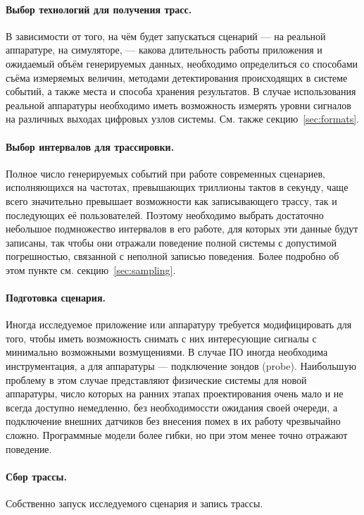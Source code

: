 \paragraph{Выбор технологий для получения трасс.} В зависимости от того, на чём будет запускаться сценарий --- на реальной аппаратуре, на симуляторе, --- какова длительность работы  приложения и ожидаемый объём генерируемых данных, необходимо определиться со способами съёма измеряемых величин, методами детектирования происходящих в системе событий, а также места и способа хранения результатов. В случае использования реальной аппаратуры необходимо иметь возможность измерять уровни сигналов на различных выходах цифровых узлов системы. См. также секцию~\ref{sec:formats}.

\paragraph{Выбор интервалов для трассировки.} Полное число генерируемых событий при работе современных сценариев, исполняющихся на частотах, превышающих триллионы тактов в секунду, чаще всего значительно превышает возможности как записывающего трассу, так и последующих её пользователей. Поэтому необходимо выбрать достаточно небольшое подмножество интервалов в его работе, для которых эти данные будут записаны, так чтобы они отражали поведение полной системы с допустимой погрешностью, связанной с неполной записью поведения. Более подробно об этом пункте см. секцию~\ref{sec:sampling}.

\paragraph{Подготовка сценария.} Иногда исследуемое приложение или аппаратуру требуется модифицировать для того, чтобы иметь возможность снимать с них интересующие сигналы с минимально возможными возмущениями. В случае ПО иногда необходима инструментация, а для аппаратуры --- подключение зондов (\abbr probe). Наибольшую проблему в этом случае представляют физические системы для новой аппаратуры, число которых на ранних этапах проектирования очень мало и не всегда доступно немедленно, без необходимоссти ожидания своей очереди, а подключение внешних датчиков без внесения помех в их работу чрезвычайно сложно. Программные модели более гибки, но при этом менее точно отражают поведение.

\paragraph{Сбор трассы.} Собственно запуск исследуемого сценария и запись трассы.

